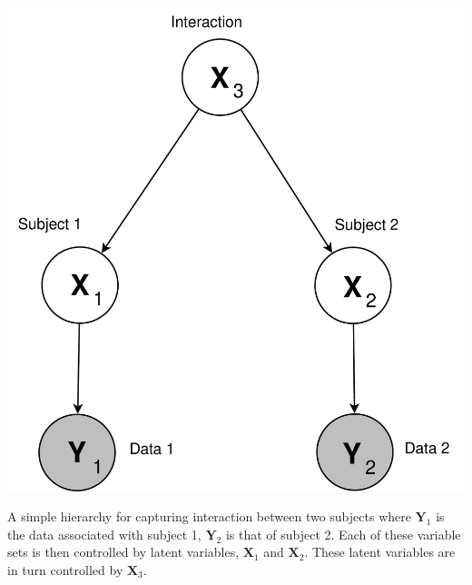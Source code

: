 \documentclass[english,color,smalltitle]{manchesterposter}
\begin{document}
\begin{multicols}{5}{\LARGE \par}
\begin{columnbox}
\-


%
\begin{minipage}[c][1\totalheight]{1\columnwidth}%
\begin{center}
\includegraphics[width=0.7\columnwidth]{./diagrams/twoSubjects}
\par\end{center}{\LARGE \par}

\begin{center}
\small A simple hierarchy for capturing interaction between two subjects
where $\mathbf{Y}_{1}$ is the data associated with subject 1, $\mathbf{Y}_{2}$
is that of subject 2. Each of these variable sets is then controlled
by latent variables, $\mathbf{X}_{1}$ and $\mathbf{X}_{2}$. These
latent variables are in turn controlled by $\mathbf{X}_{3}$. \label{fig:twoSubjects}
\par\end{center}%
\end{minipage}{\large \par}

\end{columnbox}


\begin{columnbox}
\-



\end{columnbox}
\end{multicols}
\end{document}
